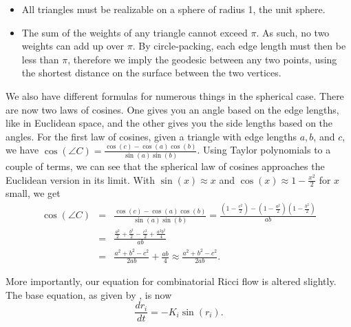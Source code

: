 \documentclass[12pt]{article}
\begin{document}
\begin{itemize}
\item All triangles must be realizable on a sphere of radius 1, the unit sphere. 
\item The sum of the weights of any triangle cannot exceed $\pi.$ As such, no two weights can add up over $\pi$. By circle-packing, each edge length must then be less than $\pi$, therefore we imply the geodesic between any two points, using the shortest distance on the surface between the two vertices. 
\end{itemize}

 We also have different formulas for numerous things in the spherical case. There are now two laws of cosines. One gives you an angle based on the edge lengths, like in Euclidean space, and the other gives you the side lengths based on the angles. For the first law of cosines, given a triangle with edge lengths $a, b$, and $c$, we have $\cos(\angle C) = \frac{\cos(c) - \cos(a)\cos(b)}{\sin(a)\sin(b)}$. Using Taylor polynomials to a couple of terms, we can see that the spherical law of cosines approaches the Euclidean version in its limit. With $\sin(x) \approx x$ and $\cos(x) \approx 1 - \frac{x^2}{2}$ for $x$ small, we get 
\begin{eqnarray*}
\cos(\angle C) &=& \frac{\cos(c) - \cos(a)\cos(b)}{\sin(a)\sin(b)} = \frac{(1 - \frac{c^2}{2}) - (1 - \frac{a^2}{2})(1 - \frac{b^2}{2})}{ab}\\
							&=& \frac{\frac{a^2}{2} + \frac{b^2}{2} - \frac{c^2}{2} + \frac{a^2b^2}{4}}{ab}\\
							&=& \frac{a^2 + b^2 - c^2}{2ab} + \frac{ab}{4} \approx \frac{a^2 + b^2 - c^2}{2ab}.
\end{eqnarray*}

 More importantly, our equation for combinatorial Ricci flow is altered slightly. The base equation, as given by \cite{chowluo}, is now 
\begin{equation}
\label{SRiccif}
\frac{dr_i}{dt} = -K_i\sin(r_i).
\end{equation}
\end{document}
